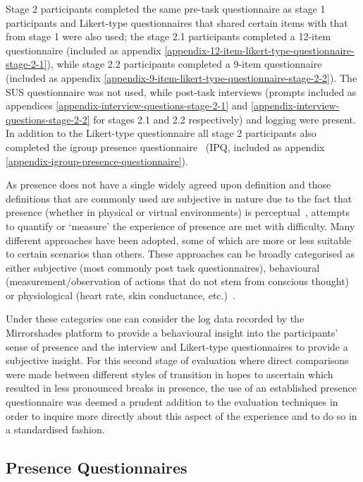 Stage 2 participants completed the same pre-task questionnaire as stage 1 participants and Likert-type questionnaires that shared certain items with that from stage 1 were also used; the stage 2.1 participants completed a 12-item questionnaire (included as appendix \ref{appendix-12-item-likert-type-questionnaire-stage-2-1}), while stage 2.2 participants completed a 9-item questionnaire (included as appendix \ref{appendix-9-item-likert-type-questionnaire-stage-2-2}). The SUS questionnaire was not used, while post-task interviews (prompts included as appendices \ref{appendix-interview-questions-stage-2-1} and \ref{appendix-interview-questions-stage-2-2} for stages 2.1 and 2.2 respectively) and logging were present. In addition to the Likert-type questionnaire all stage 2 participants also completed the igroup presence questionnaire~\cite{Schubert2001} (IPQ, included as appendix \ref{appendix-igroup-presence-questionnaire}).

As presence does not have a single widely agreed upon definition and those definitions that are commonly used are subjective in nature due to the fact that presence (whether in physical or virtual environments) is perceptual~\cite{Waterworth2014}, attempts to quantify or `measure' the experience of presence are met with difficulty. Many different approaches have been adopted, some of which are more or less suitable to certain scenarios than others. These approaches can be broadly categorised as either subjective (most commonly post task questionnaires), behavioural (measurement/observation of actions that do not stem from conscious thought) or physiological (heart rate, skin conductance, etc.)~\cite{Insko2003}.

Under these categories one can consider the log data recorded by the Mirrorshades platform to provide a behavioural insight into the participants' sense of presence and the interview and Likert-type questionnaires to provide a subjective insight. For this second stage of evaluation where direct comparisons were made between different styles of transition in hopes to ascertain which resulted in less pronounced breaks in presence, the use of an established presence questionnaire was deemed a prudent addition to the evaluation techniques in order to inquire more directly about this aspect of the experience and to do so in a standardised fashion.


\subsection{Presence Questionnaires}

